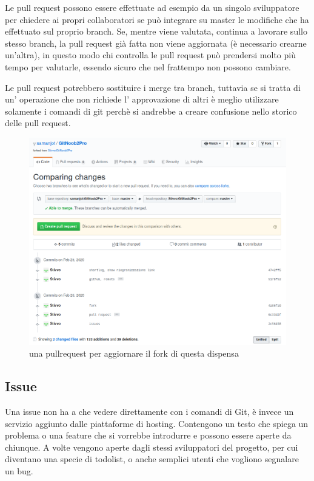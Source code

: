 \documentclass{article}
\begin{document}
Le pull request possono essere effettuate ad esempio da un singolo sviluppatore
per chiedere ai propri collaboratori se può integrare su master le modifiche che ha
effettuato sul proprio branch. Se, mentre viene valutata, continua a lavorare
sullo stesso branch, la pull request già fatta non viene aggiornata
(è necessario crearne un'altra), in questo modo chi controlla le pull
request può prendersi molto più tempo per valutarle, essendo sicuro che nel
frattempo non possono cambiare.

Le pull request potrebbero sostituire i merge tra branch, tuttavia se si
tratta di un' operazione che non richiede l' approvazione di altri è meglio
utilizzare solamente i comandi di git perchè si andrebbe a creare confusione 
nello storico delle pull request.

\begin{figure}
\includegraphics[width=6in]{img/pullRequest.png}
\centering
\caption{una pullrequest per aggiornare il fork di questa dispensa 
}
\end{figure}

\subsection{Issue\label{issue}}
Una issue non ha a che vedere direttamente con i comandi di Git, è invece un
servizio aggiunto dalle piattaforme di hosting. Contengono un testo che spiega
un problema o una feature che si vorrebbe introdurre e possono essere aperte da
chiunque.
A volte vengono aperte dagli stessi sviluppatori del progetto, per cui diventano
una specie di todolist, o anche semplici utenti che vogliono segnalare un bug.
\end{document}
